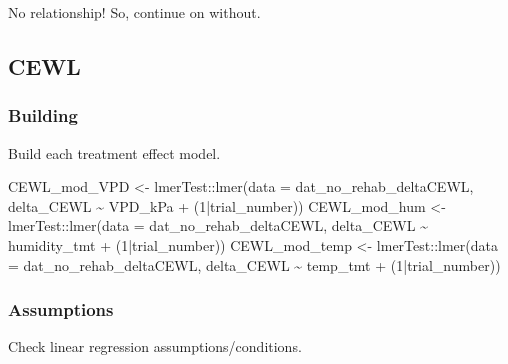 \documentclass[
]{article}
\newenvironment{Shaded}{\begin{snugshade}}{\end{snugshade}}
\newcommand{\AttributeTok}[1]{\textcolor[rgb]{0.77,0.63,0.00}{#1}}
\newcommand{\CommentTok}[1]{\textcolor[rgb]{0.56,0.35,0.01}{\textit{#1}}}
\newcommand{\DecValTok}[1]{\textcolor[rgb]{0.00,0.00,0.81}{#1}}
\newcommand{\FunctionTok}[1]{\textcolor[rgb]{0.00,0.00,0.00}{#1}}
\newcommand{\NormalTok}[1]{#1}
\newcommand{\OtherTok}[1]{\textcolor[rgb]{0.56,0.35,0.01}{#1}}
\newcommand{\SpecialCharTok}[1]{\textcolor[rgb]{0.00,0.00,0.00}{#1}}
\begin{document}
No relationship! So, continue on without.

\hypertarget{cewl-1}{%
\subsection{CEWL}\label{cewl-1}}

\hypertarget{building-3}{%
\subsubsection{Building}\label{building-3}}

Build each treatment effect model.

\begin{Shaded}
\begin{Highlighting}[]
\NormalTok{CEWL\_mod\_VPD }\OtherTok{\textless{}{-}}\NormalTok{ lmerTest}\SpecialCharTok{::}\FunctionTok{lmer}\NormalTok{(}\AttributeTok{data =}\NormalTok{ dat\_no\_rehab\_deltaCEWL,}
\NormalTok{                               delta\_CEWL }\SpecialCharTok{\textasciitilde{}}\NormalTok{ VPD\_kPa }\SpecialCharTok{+}
\NormalTok{                              (}\DecValTok{1}\SpecialCharTok{|}\NormalTok{trial\_number))}
\NormalTok{CEWL\_mod\_hum }\OtherTok{\textless{}{-}}\NormalTok{ lmerTest}\SpecialCharTok{::}\FunctionTok{lmer}\NormalTok{(}\AttributeTok{data =}\NormalTok{ dat\_no\_rehab\_deltaCEWL,}
\NormalTok{                               delta\_CEWL }\SpecialCharTok{\textasciitilde{}}\NormalTok{ humidity\_tmt }\SpecialCharTok{+}
\NormalTok{                              (}\DecValTok{1}\SpecialCharTok{|}\NormalTok{trial\_number))}
\NormalTok{CEWL\_mod\_temp }\OtherTok{\textless{}{-}}\NormalTok{ lmerTest}\SpecialCharTok{::}\FunctionTok{lmer}\NormalTok{(}\AttributeTok{data =}\NormalTok{ dat\_no\_rehab\_deltaCEWL,}
\NormalTok{                               delta\_CEWL }\SpecialCharTok{\textasciitilde{}}\NormalTok{ temp\_tmt }\SpecialCharTok{+}
\NormalTok{                              (}\DecValTok{1}\SpecialCharTok{|}\NormalTok{trial\_number))}
\end{Highlighting}
\end{Shaded}

\hypertarget{assumptions-3}{%
\subsubsection{Assumptions}\label{assumptions-3}}

Check linear regression assumptions/conditions.

\begin{Shaded}
\end{Shaded}
\end{document}
